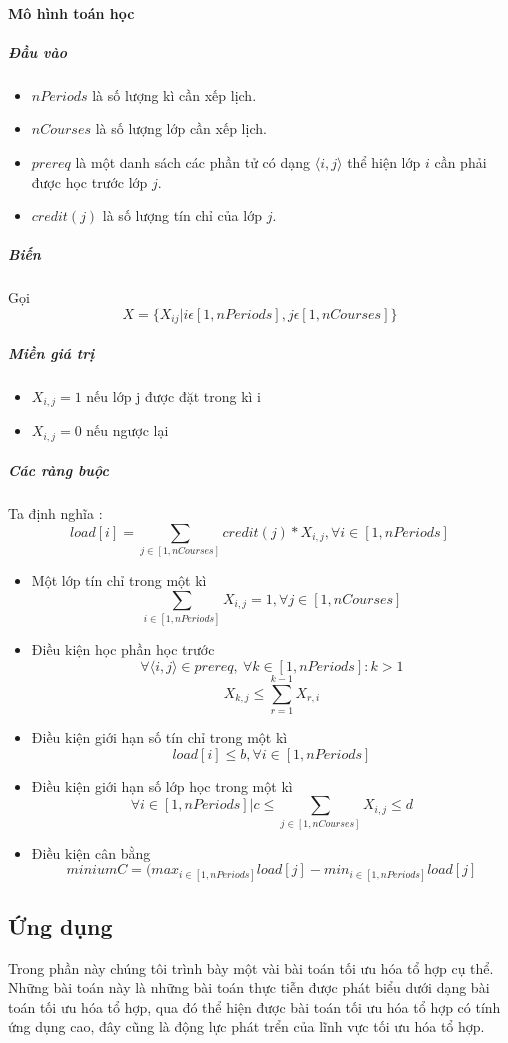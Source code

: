 \documentclass[a4paper,12pt]{report}
\begin{document}
\paragraph{Mô hình toán học}
\subparagraph{Đầu vào}
\begin{itemize}
	\item $nPeriods$ là số lượng kì cần xếp lịch.
	\item $nCourses$  là số lượng lớp cần xếp lịch.
	\item $prereq$ là một danh sách các phần tử có dạng $\langle i,j \rangle $ thể hiện lớp $i$ cần phải được học trước lớp $j$.
	\item $credit(j)$ là số lượng tín chỉ của lớp $j$.
\end{itemize}
\subparagraph{Biến}
Gọi $$X= \{ X_{ij}|i\epsilon [1,nPeriods],j\epsilon [1,nCourses]  \} $$

\subparagraph{Miền giá trị}
\begin{itemize}
\item $X_{i,j}=1$ nếu lớp j được đặt trong kì i
\item $X_{i,j}=0$ nếu ngược lại 
\end{itemize}
\subparagraph{Các ràng buộc}
Ta định nghĩa : $$load[i]=\sum_{j \in [1,nCourses] } credit(j) *X_{i,j}   ,\forall i \in [1,nPeriods]$$
\begin{itemize}
\item Một lớp tín chỉ trong một kì 
$$   \sum_{i \in [1,nPeriods] } X_{i,j}=1,\forall j \in[1,nCourses]  $$

\item Điều kiện học phần học trước $$ \forall\langle i,j\rangle \in prereq, \ \forall k \in [1,nPeriods]: k>1  $$
$$X_{k,j} \leq \sum^{k-1}_{r=1} X_{r,i} $$ 
\item Điều kiện giới hạn số tín chỉ trong một kì $$load[i] \leq b, \forall i \in [1,nPeriods]$$
\item Điều kiện giới hạn số lớp học trong một kì $$\forall i \in [1,nPeriods] | c \leq \sum_{j \in [1,nCourses]} X_{i,j} \leq d$$
\item Điều kiện cân bằng $$minium  C= (max_{i \in [1,nPeriods]} load[j] -min_{i \in [1,nPeriods]} load[j] $$
\end{itemize}
\subsection{Ứng dụng}
Trong phần này chúng tôi trình bày một vài bài toán tối ưu hóa tổ hợp cụ thể. Những bài toán này là những bài toán thực tiễn được phát biểu dưới dạng bài toán tối ưu hóa tổ hợp, qua đó thể hiện được bài toán tối ưu hóa tổ hợp có tính ứng dụng cao, đây cũng là động lực phát trển của lĩnh vực tối ưu hóa tổ hợp\cite{TUHTT}.
\end{document}
